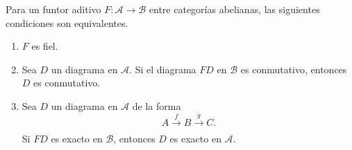 \documentclass[tesis]{subfiles}
\begin{document}
\begin{Teo}\label{Mendoza-1.10.6}
    Para un funtor aditivo $F:\mathscr{A}\to \mathscr{B}$ entre categorías abelianas, las siguientes condiciones son equivalentes.

    \begin{enumerate}[label=(\alph*)]
    
        \item $F$ es fiel.

        \item Sea $D$ un diagrama en $\mathscr{A}$. Si el diagrama $FD$ en $\mathscr{B}$ es conmutativo, entonces $D$ es conmutativo.

        \item Sea $D$ un diagrama en $\mathscr{A}$ de la forma
            \[
            A \xrightarrow[]{f} B\xrightarrow[]{g} C.
            \] 
            Si $FD$ es exacto en $\mathscr{B}$, entonces $D$ es exacto en $\mathscr{A}$.
    \end{enumerate}
\end{Teo}
\end{document}
